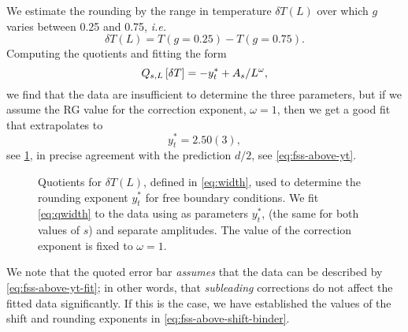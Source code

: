 We estimate the rounding by the range in temperature $\delta T(L)$ over which
$g$ varies between 0.25 and 0.75, \emph{i.e.}
\begin{equation}
  \delta T(L) = T(g=0.25) - T(g=0.75).
  \label{eq:width}
\end{equation}
Computing the quotients and fitting the form
\begin{equation}
  Q_{s,L}\left[\delta T\right] = -y_t^* + A_s/L^{\omega},
  \label{eq:qwidth}
\end{equation}
we find that the data are insufficient to determine the three parameters, but
if we assume the RG value for the correction exponent, $\omega=1$, then we get
a good fit that extrapolates to
\begin{equation}
  y_t^* = 2.50(3),
  \label{eq:fss-above-yt-fit}
\end{equation}
see \cref{fig:qwidth}, in precise agreement with the prediction $d/2$, see
\cref{eq:fss-above-yt}.
\begin{figure}
  \centering
  
  \caption[
    Quotient estimation of the width exponent $y_t^*$ for $k=0$ modes of the
    five-dimensional Ising model with free boundary conditions.
  ]
  {
    Quotients for $\delta T(L)$, defined in \cref{eq:width}, used to
    determine the rounding exponent $y_t^*$ for free boundary conditions. We fit
    \cref{eq:qwidth} to the data using as parameters $y_t^*$, (the same
    for both values of $s$) and separate amplitudes. The value of the
    correction exponent is fixed to $\omega=1$.
  } \label{fig:qwidth}
\end{figure}
We note that the quoted error bar \emph{assumes} that the data can be described
by \cref{eq:fss-above-yt-fit}; in other words, that \emph{subleading}
corrections do not affect the fitted data significantly. If this is the case,
we have established the values of the shift and rounding exponents in
\cref{eq:fss-above-shift-binder}.

